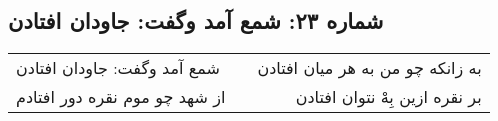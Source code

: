 \begin{center}
\section*{شماره ۲۳: شمع آمد وگفت: جاودان افتادن}
\label{sec:023}
\begin{longtable}{l p{0.5cm} r}
شمع آمد وگفت: جاودان افتادن
&&
به زانکه چو من به هر میان افتادن
\\
از شهد چو موم نقره دور افتادم
&&
بر نقره ازین بِهْ نتوان افتادن
\\
\end{longtable}
\end{center}
